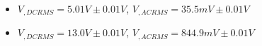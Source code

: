 \begin{itemize}
     \item $V_{, DCRMS}=5.01V\pm 0.01\unit{V}$, $V_{, ACRMS}=35.5mV\pm 0.01\unit{V}$ 
     \item $V_{, DCRMS}=13.0V\pm 0.01\unit{V}$, $V_{, ACRMS}=844.9mV\pm 0.01\unit{V}$\\
\end{itemize}